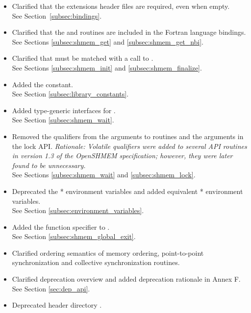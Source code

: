 \begin{itemize}

\item Clarified that the \openshmem extensions header files are required, even when empty.
\\See Section~\ref{subsec:bindings}.
%
\item Clarified that the  and 
    routines are included in the Fortran language bindings.\\
    See Sections \ref{subsec:shmem_get} and \ref{subsec:shmem_get_nbi}.
%
\item Clarified that  must be matched with a call to
    .
\\See Sections \ref{subsec:shmem_init} and \ref{subsec:shmem_finalize}.
%
\item Added the  constant.
\\See Section \ref{subsec:library_constants}.
%
\item Added type-generic interfaces for .
\\ See Section \ref{subsec:shmem_wait}.
%
\item Removed the  qualifiers from the  arguments to
 routines and the  arguments in the lock API.
\emph{Rationale: Volatile qualifiers were added to several API routines in
version 1.3 of the OpenSHMEM specification; however, they were later found
to be unnecessary.}
\\ See Sections \ref{subsec:shmem_wait} and \ref{subsec:shmem_lock}.
%
\item Deprecated the * environment variables and added equivalent
* environment variables.
\\ See Section \ref{subsec:environment_variables}.
%
\item Added the \Cstd[11]  function specifier to
.
\\ See Section \ref{subsec:shmem_global_exit}.
%
\item Clarified ordering semantics of memory ordering, point-to-point synchronization and collective 
synchronization routines.
%
\item Clarified deprecation overview and added deprecation rationale in Annex F.
\\See Section \ref{sec:dep_api}.
%
\item Deprecated header directory .

\end{itemize}
